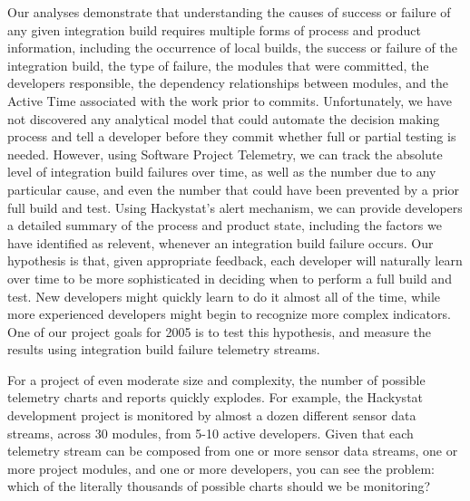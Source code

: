 \documentclass[11pt,twocolumn]{article}
\begin{document}
Our analyses demonstrate that understanding the causes of success or
failure of any given integration build requires multiple forms of process
and product information, including the occurrence of local builds, the
success or failure of the integration build, the type of failure, the
modules that were committed, the developers responsible, the dependency
relationships between modules, and the Active Time associated with the work
prior to commits.  Unfortunately, we have not discovered any analytical
model that could automate the decision making process and tell a developer
before they commit whether full or partial testing is needed.  However,
using Software Project Telemetry, we can track the absolute level of
integration build failures over time, as well as the number due to any
particular cause, and even the number that could have been prevented by a
prior full build and test.  Using Hackystat's alert mechanism, we can
provide developers a detailed summary of the process and product state,
including the factors we have identified as relevent, whenever an
integration build failure occurs.  Our hypothesis is that, given
appropriate feedback, each developer will naturally learn over time to be
more sophisticated in deciding when to perform a full build and test.  New
developers might quickly learn to do it almost all of the time, while more
experienced developers might begin to recognize more complex indicators. 
One of our project goals for 2005 is to test this hypothesis, and measure
the results using integration build failure telemetry streams.



For a project of even moderate size and complexity, the number of possible
telemetry charts and reports quickly explodes.  For example, the
Hackystat development project is monitored by almost a dozen different sensor data
streams, across 30 modules, from 5-10 active developers.  Given that
each telemetry stream can be composed from one or more sensor data streams,
one or more project modules, and one or more developers, you can see the
problem: which of the literally thousands of possible charts should we be
monitoring? 
\end{document}
